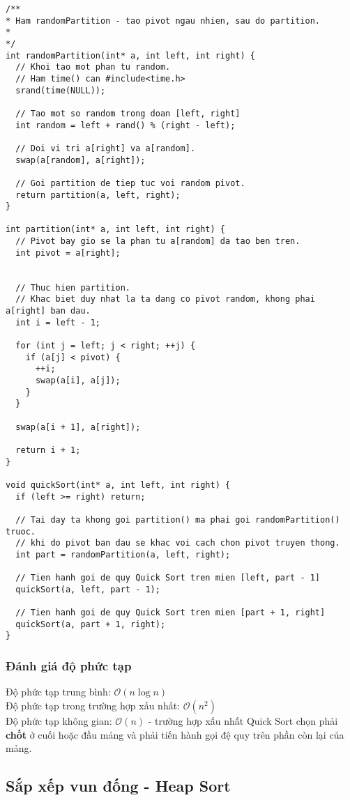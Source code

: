 \documentclass[]{article}
\begin{document}
\begin{lstlisting}
/**
* Ham randomPartition - tao pivot ngau nhien, sau do partition.
*
*/
int randomPartition(int* a, int left, int right) {
  // Khoi tao mot phan tu random.
  // Ham time() can #include<time.h>
  srand(time(NULL));

  // Tao mot so random trong doan [left, right]
  int random = left + rand() % (right - left);

  // Doi vi tri a[right] va a[random].
  swap(a[random], a[right]);

  // Goi partition de tiep tuc voi random pivot.
  return partition(a, left, right);
}

int partition(int* a, int left, int right) {
  // Pivot bay gio se la phan tu a[random] da tao ben tren.
  int pivot = a[right];


  // Thuc hien partition.
  // Khac biet duy nhat la ta dang co pivot random, khong phai a[right] ban dau.
  int i = left - 1;

  for (int j = left; j < right; ++j) {
    if (a[j] < pivot) {
      ++i;
      swap(a[i], a[j]);
    }
  }

  swap(a[i + 1], a[right]);

  return i + 1;
}

void quickSort(int* a, int left, int right) {
  if (left >= right) return;

  // Tai day ta khong goi partition() ma phai goi randomPartition() truoc.
  // khi do pivot ban dau se khac voi cach chon pivot truyen thong.
  int part = randomPartition(a, left, right);

  // Tien hanh goi de quy Quick Sort tren mien [left, part - 1]
  quickSort(a, left, part - 1);

  // Tien hanh goi de quy Quick Sort tren mien [part + 1, right]
  quickSort(a, part + 1, right);
}
\end{lstlisting}
\subsubsection{Đánh giá độ phức tạp}
Độ phức tạp trung bình: $\mathcal{O}(n \log n)$
\\
Độ phức tạp trong trường hợp xấu nhất: $\mathcal{O}(n^2)$
\\
Độ phức tạp không gian: $\mathcal{O}(n)$ - trường hợp xấu nhất Quick Sort chọn phải \textbf{chốt} ở cuối hoặc đầu mảng và phải tiến hành gọi đệ quy trên phần còn lại của mảng.

\subsection{Sắp xếp vun đống - Heap Sort}
\end{document}
